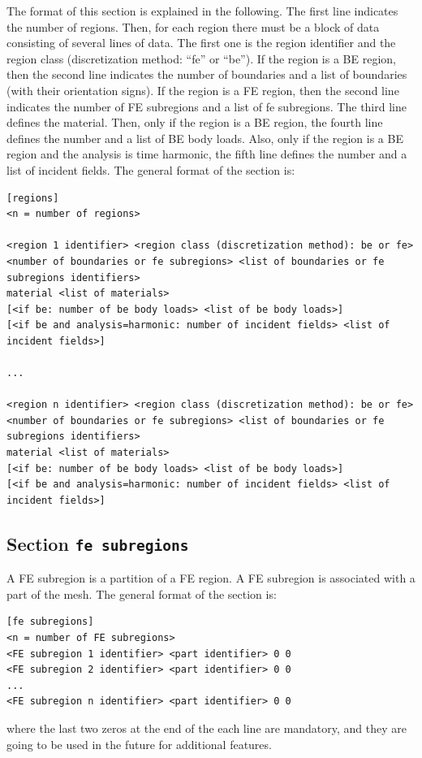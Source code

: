 \documentclass[a4paper,fleqn]{book}
\begin{document}
The format of this section is explained in the following. The first line indicates the number of regions. Then, for each region there must be a block of data consisting of several lines of data. The first one is the region identifier and the region class (discretization method: ``fe'' or ``be''). If the region is a BE region, then the second line indicates the number of boundaries and a list of boundaries (with their orientation signs). If the region is a FE region, then the second line indicates the number of FE subregions and a list of fe subregions. The third line defines the material. Then, only if the region is a BE region, the fourth line defines the number and a list of BE body loads. Also, only if the region is a BE region and the analysis is time harmonic, the fifth line defines the number and a list of incident fields. The general format of the section is:
\begin{Verbatim}[frame=single, fontsize=\small, label={general format of section [regions]}]
[regions]
<n = number of regions>

<region 1 identifier> <region class (discretization method): be or fe> 
<number of boundaries or fe subregions> <list of boundaries or fe subregions identifiers>
material <list of materials>
[<if be: number of be body loads> <list of be body loads>]
[<if be and analysis=harmonic: number of incident fields> <list of incident fields>]

...

<region n identifier> <region class (discretization method): be or fe> 
<number of boundaries or fe subregions> <list of boundaries or fe subregions identifiers>
material <list of materials>
[<if be: number of be body loads> <list of be body loads>]
[<if be and analysis=harmonic: number of incident fields> <list of incident fields>]
\end{Verbatim} 

\subsection{Section \texttt{fe subregions}}
\label{sec:fe_subregions}

A FE subregion is a partition of a FE region. A FE subregion is associated with a part of the mesh. The general format of the section is:
\begin{Verbatim}[frame=single, fontsize=\small, label={general format of section [fe subregions]}]
[fe subregions]
<n = number of FE subregions>
<FE subregion 1 identifier> <part identifier> 0 0
<FE subregion 2 identifier> <part identifier> 0 0
...
<FE subregion n identifier> <part identifier> 0 0
\end{Verbatim}
where the last two zeros at the end of the each line are mandatory, and they are going to be used in the future for additional features.
\end{document}
